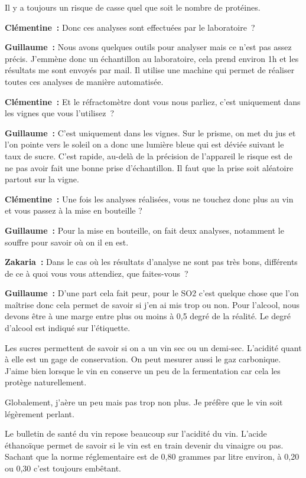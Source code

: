\documentclass[a4paper, titlepage]{report}
\begin{document}
Il y a toujours un risque de casse quel que soit le nombre de protéines.

\textbf{Clémentine~:} Donc ces analyses sont effectuées par le
laboratoire~?

\textbf{Guillaume~:} Nous avons quelques outils pour analyser mais ce
n'est pas assez précis. J'emmène donc un échantillon au laboratoire,
cela prend environ 1h et les résultats me sont envoyés par mail. Il
utilise une machine qui permet de réaliser toutes ces analyses de
manière automatisée.

\textbf{Clémentine~:} Et le réfractomètre dont vous nous parliez, c'est
uniquement dans les vignes que vous l'utilisez~?

\textbf{Guillaume~:} C'est uniquement dans les vignes. Sur le prisme, on
met du jus et l'on pointe vers le soleil on a donc une lumière bleue qui
est déviée suivant le taux de sucre. C'est rapide, au-delà de la
précision de l'appareil le risque est de ne pas avoir fait une bonne
prise d'échantillon. Il faut que la prise soit aléatoire partout sur la
vigne.

\textbf{Clémentine~:} Une fois les analyses réalisées, vous ne touchez
donc plus au vin et vous passez à la mise en bouteille ?

\textbf{Guillaume~:} Pour la mise en bouteille, on fait deux analyses,
notamment le souffre pour savoir où on il en est.

\textbf{Zakaria~:} Dans le cas où les résultats d'analyse ne sont pas
très bons, différents de ce à quoi vous vous attendiez, que faites-vous~?

\textbf{Guillaume~:} D'une part cela fait peur, pour le SO2 c'est
quelque chose que l'on maîtrise donc cela permet de savoir si j'en ai
mis trop ou non. Pour l'alcool, nous devons être à une marge entre plus
ou moins à 0,5 degré de la réalité. Le degré d'alcool est indiqué sur
l'étiquette.

Les sucres permettent de savoir si on a un vin sec ou un
demi-sec. L'acidité quant à elle est un gage de conservation. On peut
mesurer aussi le gaz carbonique. J'aime bien lorsque le vin en conserve
un peu de la fermentation car cela les protège naturellement.

Globalement, j'aère un peu mais pas trop non plus. Je préfère que le vin
soit légèrement perlant.

Le bulletin de santé du vin repose beaucoup sur l'acidité du vin.
L'acide éthanoïque permet de savoir si le vin est en train devenir du
vinaigre ou pas. Sachant que la norme réglementaire est de 0,80 grammes
par litre environ, à 0,20 ou 0,30 c'est toujours embêtant.
\end{document}
